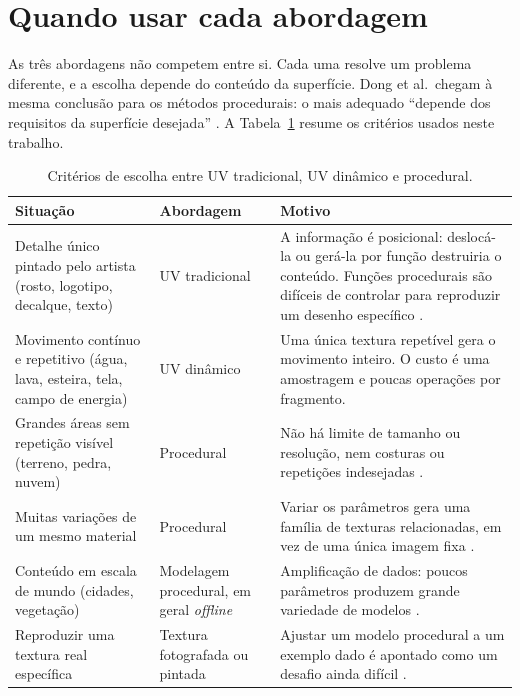 \section{Quando usar cada abordagem}

As três abordagens não competem entre si. Cada uma resolve um problema diferente, e a escolha depende do conteúdo da superfície. Dong et al.\ chegam à mesma conclusão para os métodos procedurais: o mais adequado ``depende dos requisitos da superfície desejada'' \cite[p.~22]{dong2020}. A Tabela~\ref{tab:quando-usar} resume os critérios usados neste trabalho.

\begin{table}[H]
\centering
\caption{Critérios de escolha entre UV tradicional, UV dinâmico e procedural.}
\label{tab:quando-usar}
\small
\begin{tabular}{p{4.2cm}p{3.2cm}p{6.4cm}}
\toprule
\textbf{Situação} & \textbf{Abordagem} & \textbf{Motivo} \\
\midrule
Detalhe único pintado pelo artista (rosto, logotipo, decalque, texto) & UV tradicional & A informação é posicional: deslocá-la ou gerá-la por função destruiria o conteúdo. Funções procedurais são difíceis de controlar para reproduzir um desenho específico \cite[p.~2]{dong2020}. \\
\addlinespace
Movimento contínuo e repetitivo (água, lava, esteira, tela, campo de energia) & UV dinâmico & Uma única textura repetível gera o movimento inteiro. O custo é uma amostragem e poucas operações por fragmento. \\
\addlinespace
Grandes áreas sem repetição visível (terreno, pedra, nuvem) & Procedural & Não há limite de tamanho ou resolução, nem costuras ou repetições indesejadas \cite[p.~2]{dong2020}. \\
\addlinespace
Muitas variações de um mesmo material & Procedural & Variar os parâmetros gera uma família de texturas relacionadas, em vez de uma única imagem fixa \cite[p.~2]{dong2020}. \\
\addlinespace
Conteúdo em escala de mundo (cidades, vegetação) & Modelagem procedural, em geral \textit{offline} & Amplificação de dados: poucos parâmetros produzem grande variedade de modelos \cite[p.~1]{smelik2014}. \\
\addlinespace
Reproduzir uma textura real específica & Textura fotografada ou pintada & Ajustar um modelo procedural a um exemplo dado é apontado como um desafio ainda difícil \cite[p.~23]{dong2020}. \\
\bottomrule
\end{tabular}
\end{table}

